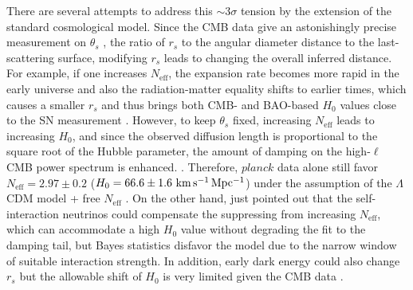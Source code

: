 \documentclass[useAMS,usenatbib]{mnras}
\def\planck{\textit{planck}}
\def\kmsmpc{\rm km\,s^{-1}\,Mpc^{-1}}
\begin{document}
There are several attempts to address this $\sim 3\sigma$ tension by the extension of the standard cosmological model. 
Since the CMB data give an astonishingly precise measurement on $\theta_{s}$ \citep[$\sim 0.05\%$;][]{planck18parameter}, the ratio of $r_{s}$ to the angular diameter distance to the last-scattering surface, modifying $r_{s}$ leads to changing the overall inferred distance. 
For example, if one increases $N_{\textrm{eff}}$, the expansion rate becomes more rapid in the early universe and also the radiation-matter equality shifts to earlier times, which causes a smaller $r_{s}$ and thus brings both CMB- and BAO-based $H_{0}$ values close to the SN measurement \citep[e.g.,][]{HouEtal14,HeavensEtal14,WymanEtal14,CuestaEtal15}.
However, to keep $\theta_{s}$ fixed, increasing $N_{\textrm{eff}}$ leads to increasing $H_{0}$, and since the observed diffusion length is proportional to the square root of the Hubble parameter, the amount of damping on the high-$\ell$ CMB power spectrum is enhanced. %
\citep[e.g.,][]{Silk68,HouEtal13,planck16a}. Therefore, $\planck$ data alone still favor $N_{\textrm{eff}}= 2.97\pm0.2$ ($H_{0}=66.6\pm1.6~\kmsmpc$) under the assumption of the $\Lambda$CDM model + free $N_{\textrm{eff}}$ \citep{AlamEtal17}. On the other hand, \citet{KreischEtal19} just pointed out that the self-interaction neutrinos could compensate the suppressing from increasing $N_{\textrm{eff}}$, which can accommodate a high $H_{0}$ value without degrading the fit to the damping tail, but Bayes statistics disfavor the model due to the narrow window of suitable interaction strength. In addition, early dark energy could also change $r_{s}$ but the allowable shift of $H_{0}$ is very limited given the CMB data \citep{PoulinEtal18}. %

\end{document}
